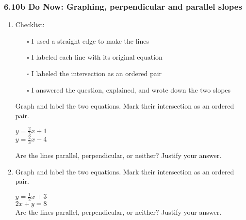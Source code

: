 \documentclass[12pt, twoside]{article}
\begin{document}
\subsubsection*{6.10b Do Now: Graphing, perpendicular and parallel slopes}
  \begin{enumerate}

  \item Checklist:
  \begin{itemize}
    \item[$\square$]   I used a straight edge to make the lines
    \item[$\square$]   I labeled each line with its original equation
    \item[$\square$]   I labeled the intersection as an ordered pair
    \item[$\square$]   I answered the question, explained, and wrote down the two slopes
  \end{itemize}
  Graph and label the two equations. Mark their intersection as an ordered pair.
    \begin{multicols}{2}
      $y =\frac{2}{3}x+1$ \\
      $y=\frac{2}{3}x-4$
    \end{multicols}     \vspace{0.1cm}
    Are the lines parallel, perpendicular, or neither? Justify your answer.
    \vspace{2.5cm}

    \begin{center} %
    \end{center}

\newpage
  \item Graph and label the two equations. Mark their intersection as an ordered pair.
      \begin{multicols}{2}
        $y =\frac{1}{2}x+3$ \\[0.25cm]
        $2x+y=8$ \\
        Are the lines parallel, perpendicular, or neither? Justify your answer.
      \end{multicols}     \vspace{0.1cm}
      \vspace{1cm}


\end{enumerate}
\end{document}
